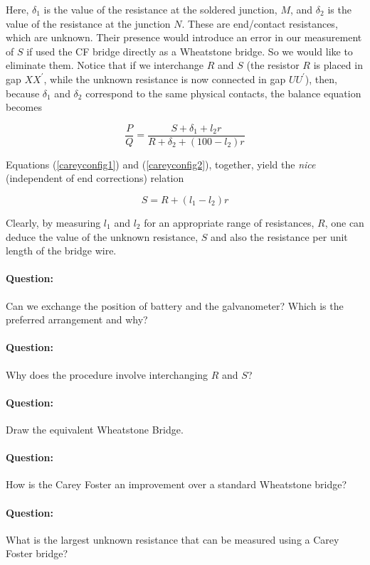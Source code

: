 \begin{refsection}
Here, $\delta_{1}$ is the value of the resistance at the soldered junction, $M$, and $\delta_{2}$ is the value of the resistance at the junction $N$. These are end/contact resistances, which are unknown. Their presence would introduce an error in our measurement of $S$ if used the CF bridge directly as a Wheatstone bridge. So we would like to eliminate them. Notice that if we interchange $R$ and $S$ (the resistor $R$ is placed in gap $XX^{\prime}$, while the unknown resistance is now connected in gap $UU^{\prime}$), then, because $\delta_1$ and $\delta_2$ correspond to the same physical contacts, the balance equation becomes

\begin{equation}
\frac{P}{Q}=\frac{S+\delta_{1}+l_{2}r}{R+\delta_{2}+(100-l_{2})r}
\label{careyconfig2}
\end{equation}

Equations (\ref{careyconfig1}) and (\ref{careyconfig2}), together, yield the \textit{nice} (independent of end corrections) relation

\begin{equation}
S = R + (l_1-l_2)r
\label{CF}
\end{equation}

Clearly, by measuring $l_1$ and $l_2$ for an appropriate range of resistances, $R$, one can deduce the value of the unknown resistance, $S$ and also the resistance per unit length of the bridge wire. 

\begin{question}
\paragraph{Question:} Can we exchange the position of battery and the galvanometer? Which is the preferred arrangement and why?
\paragraph{Question:} Why does the procedure involve interchanging $R$ and $S$?
\paragraph{Question:} Draw the equivalent Wheatstone Bridge.
\paragraph{Question:} How is the Carey Foster an improvement over a standard Wheatstone bridge?
\paragraph{Question:} What is the largest unknown resistance that can be measured using a Carey Foster bridge?

\end{question}
\end{refsection}
